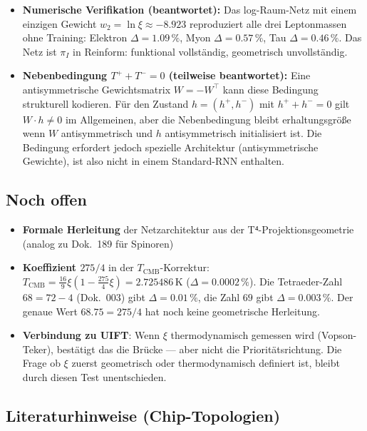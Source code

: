 \begin{itemize}
  \item \textbf{Numerische Verifikation (beantwortet):}
        Das log-Raum-Netz mit einem einzigen Gewicht $w_2 = \ln\xi \approx -8.923$
        reproduziert alle drei Leptonmassen ohne Training:
        Elektron $\Delta=1.09\,\%$, Myon $\Delta=0.57\,\%$, Tau $\Delta=0.46\,\%$.
        Das Netz ist $\pi_I$ in Reinform: funktional vollständig, geometrisch unvollständig.

  \item \textbf{Nebenbedingung $T^+ + T^- = 0$ (teilweise beantwortet):}
        Eine antisymmetrische Gewichtsmatrix $W = -W^\top$ kann diese Bedingung
        strukturell kodieren. Für den Zustand $h = (h^+, h^-)$ mit $h^+ + h^- = 0$
        gilt $W \cdot h \neq 0$ im Allgemeinen, aber die Nebenbedingung bleibt
        erhaltungsgröße wenn $W$ antisymmetrisch und $h$ antisymmetrisch initialisiert
        ist. Die Bedingung erfordert jedoch spezielle Architektur (antisymmetrische
        Gewichte), ist also nicht in einem Standard-RNN enthalten.
\end{itemize}

\subsection*{Noch offen}

\begin{itemize}
  \item \textbf{Formale Herleitung} der Netzarchitektur aus der
        T⁴-Projektionsgeometrie (analog zu Dok.~189 für Spinoren)

  \item \textbf{Koeffizient $275/4$} in der $T_\text{CMB}$-Korrektur:
        $T_\text{CMB} = \tfrac{16}{9}\xi(1 - \tfrac{275}{4}\xi) = 2.725486\,\text{K}$
        ($\Delta = 0.0002\,\%$). Die Tetraeder-Zahl $68 = 72-4$ (Dok.~003) gibt
        $\Delta = 0.01\,\%$, die Zahl $69$ gibt $\Delta = 0.003\,\%$.
        Der genaue Wert $68.75 = 275/4$ hat noch keine geometrische Herleitung.

  \item \textbf{Verbindung zu UIFT}: Wenn $\xi$ thermodynamisch gemessen wird
        (Vopson-Teker), bestätigt das die Brücke --- aber nicht die Prioritätsrichtung.
        Die Frage ob $\xi$ zuerst geometrisch oder thermodynamisch definiert ist,
        bleibt durch diesen Test unentschieden.
\end{itemize}

\subsection*{Literaturhinweise (Chip-Topologien)}

